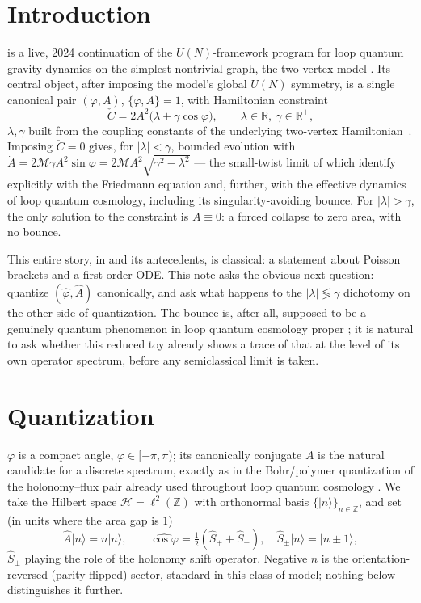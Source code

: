 \documentclass[11pt]{amsart}
\theoremstyle{remark}
\begin{document}
\section{Introduction}

\cite{CendalGarayGaray} is a live, 2024 continuation of the $U(N)$-framework program for loop quantum gravity dynamics on the simplest nontrivial graph, the two-vertex model \cite{BorjaFreidelGarayLivine,BorjaDiazPoloGarayLivine,BorjaGarayVidotto,AranguerenGarayLivine,LivineMartinBenito}. Its central object, after imposing the model's global $U(N)$ symmetry, is a single canonical pair $(\varphi,A)$, $\{\varphi,A\}=1$, with Hamiltonian constraint
\begin{equation}\label{eq:classical-constraint}
\check C = 2A^2\big(\lambda+\gamma\cos\varphi\big),\qquad \lambda\in\mathbb R,\ \gamma\in\mathbb R^+,
\end{equation}
$\lambda,\gamma$ built from the coupling constants of the underlying two-vertex Hamiltonian~\cite{BorjaDiazPoloGarayLivine}. Imposing $\check C=0$ gives, for $|\lambda|<\gamma$, bounded evolution with $\dot A=2\mathcal M\gamma A^2\sin\varphi=2\mathcal MA^2\sqrt{\gamma^2-\lambda^2}$ --- the small-twist limit of which \cite{CendalGarayGaray} identify explicitly with the Friedmann equation and, further, with the effective dynamics of loop quantum cosmology, including its singularity-avoiding bounce. For $|\lambda|>\gamma$, the only solution to the constraint is $A\equiv0$: a forced collapse to zero area, with no bounce.

This entire story, in \cite{CendalGarayGaray} and its antecedents, is classical: a statement about Poisson brackets and a first-order ODE. This note asks the obvious next question: quantize $(\hat\varphi,\hat A)$ canonically, and ask what happens to the $|\lambda|\lessgtr\gamma$ dichotomy on the other side of quantization. The bounce is, after all, supposed to be a genuinely quantum phenomenon in loop quantum cosmology proper \cite{ANovel,APS1,APS2}; it is natural to ask whether this reduced toy already shows a trace of that at the level of its own operator spectrum, before any semiclassical limit is taken.

\section{Quantization}

$\varphi$ is a compact angle, $\varphi\in[-\pi,\pi)$; its canonically conjugate $A$ is the natural candidate for a discrete spectrum, exactly as in the Bohr/polymer quantization of the holonomy--flux pair already used throughout loop quantum cosmology \cite{APS2}. We take the Hilbert space $\mathcal H=\ell^2(\mathbb Z)$ with orthonormal basis $\{|n\rangle\}_{n\in\mathbb Z}$, and set (in units where the area gap is $1$)
\[
\hat A|n\rangle = n|n\rangle,\qquad \widehat{\cos\varphi} = \tfrac12(\hat S_++\hat S_-),\quad \hat S_\pm|n\rangle=|n\pm1\rangle,
\]
$\hat S_\pm$ playing the role of the holonomy shift operator. Negative $n$ is the orientation-reversed (parity-flipped) sector, standard in this class of model; nothing below distinguishes it further.
\end{document}
